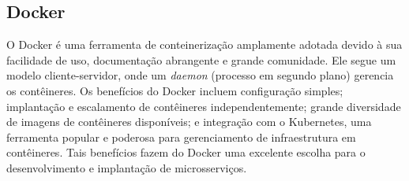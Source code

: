 \subsection*{Docker}
O Docker é uma ferramenta de conteinerização amplamente adotada devido à sua facilidade de uso, documentação abrangente e grande comunidade. Ele segue um modelo cliente-servidor, onde um \emph{daemon} (processo em segundo plano) gerencia os contêineres. Os benefícios do Docker incluem configuração simples; implantação e escalamento de contêineres independentemente; grande diversidade de imagens de contêineres disponíveis; e integração com o Kubernetes, uma ferramenta popular e poderosa para gerenciamento de infraestrutura em contêineres. Tais benefícios fazem do Docker uma excelente escolha para o desenvolvimento e implantação de microsserviços. \cite{lxc-vs-docker,podman-vs-docker}




    
    



